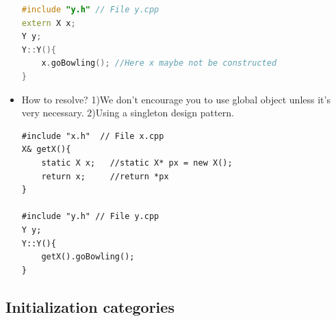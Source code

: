 \documentclass[a4paper,11pt,twoside]{book}
\begin{document}
\begin{itemize}
\begin{lstlisting}[frame=single, language=c++]
#include "y.h" // File y.cpp
extern X x;
Y y;
Y::Y(){ 
	x.goBowling(); //Here x maybe not be constructed
}
\end{lstlisting}
	
	\item  How to resolve? 1)We don't encourage you to use global object unless it's very necessary. 2)Using a singleton design pattern.
	\begin{lstlisting}[numbers=none]
#include "x.h"  // File x.cpp
X& getX(){
	static X x;   //static X* px = new X();
	return x;     //return *px
}
	
#include "y.h" // File y.cpp
Y y;
Y::Y(){
	getX().goBowling();
}
\end{lstlisting}
\end{itemize}


\subsection{Initialization  categories}
\end{document}
